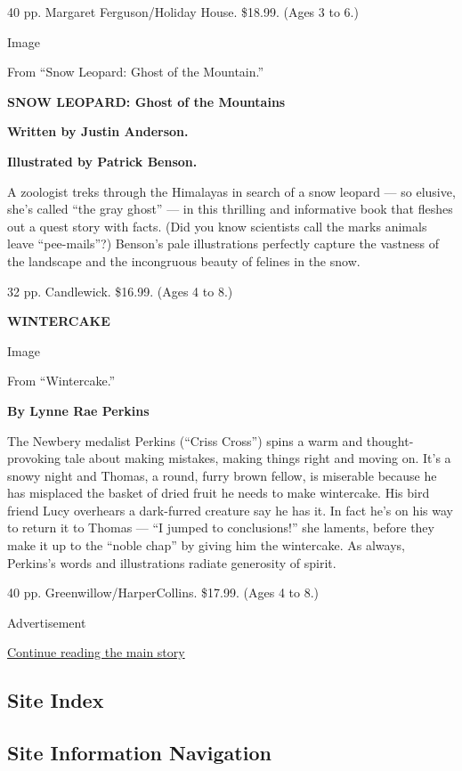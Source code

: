 40 pp. Margaret Ferguson/Holiday House. \$18.99. (Ages 3 to 6.)

Image

From ``Snow Leopard: Ghost of the Mountain.''

\textbf{SNOW LEOPARD: Ghost of the Mountains}

\textbf{Written by Justin Anderson.}

\textbf{Illustrated by Patrick Benson.}

A zoologist treks through the Himalayas in search of a snow leopard ---
so elusive, she's called ``the gray ghost'' --- in this thrilling and
informative book that fleshes out a quest story with facts. (Did you
know scientists call the marks animals leave ``pee-mails''?) Benson's
pale illustrations perfectly capture the vastness of the landscape and
the incongruous beauty of felines in the snow.

32 pp. Candlewick. \$16.99. (Ages 4 to 8.)

\textbf{WINTERCAKE}

Image

From ``Wintercake.''

\textbf{By Lynne Rae Perkins}

The Newbery medalist Perkins (``Criss Cross'') spins a warm and
thought-provoking tale about making mistakes, making things right and
moving on. It's a snowy night and Thomas, a round, furry brown fellow,
is miserable because he has misplaced the basket of dried fruit he needs
to make wintercake. His bird friend Lucy overhears a dark-furred
creature say he has it. In fact he's on his way to return it to Thomas
--- ``I jumped to conclusions!'' she laments, before they make it up to
the ``noble chap'' by giving him the wintercake. As always, Perkins's
words and illustrations radiate generosity of spirit.

40 pp. Greenwillow/HarperCollins. \$17.99. (Ages 4 to 8.)

Advertisement

\protect\hyperlink{after-bottom}{Continue reading the main story}

\hypertarget{site-index}{%
\subsection{Site Index}\label{site-index}}

\hypertarget{site-information-navigation}{%
\subsection{Site Information
Navigation}\label{site-information-navigation}}

